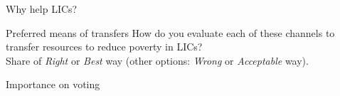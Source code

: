 \documentclass[aspectratio=169,xcolor=dvipsnames, 11pt,mathserif]{beamer}
\begin{document}
\begin{frame}{Why help LICs?}
\end{frame}

\begin{frame}{Preferred means of transfers}
    \vspace*{.5cm}
\centering How do you evaluate each of these channels to transfer resources to reduce poverty in LICs?\\ Share of \textit{Right} or \textit{Best} way (other options: \textit{Wrong} or \textit{Acceptable} way).
\end{frame}


\begin{frame}{Importance on voting}
\end{frame}
\end{document}
